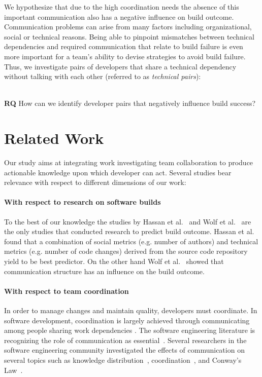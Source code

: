 \documentclass[conference]{IEEEtran}
\begin{document}
We hypothesize that due to the high coordination needs the absence of this
important communication also has a negative influence on build outcome. Communication problems can arise from many factors including organizational,
social or technical reasons. Being able to pinpoint
mismatches between technical dependencies and required communication that
relate to build failure is even more important for a team's
ability to devise strategies to avoid build failure. Thus, we
investigate pairs of developers that share a technical dependency without talking
with each other (referred to as \emph{technical pairs}):
\ \\ \


\textbf{RQ} How can we identify developer pairs that negatively influence build success?
 

 \section{Related Work}
\label{sec:relwork}
Our study aims at integrating work investigating team collaboration to produce actionable knowledge upon which developer can act.
Several studies bear relevance with respect to different dimensions of our work:

\paragraph{With respect to research on software builds}
To the best of our knowledge the studies by Hassan et al.~\cite{hassan:ase:2006}
and Wolf et al.~\cite{wolf:icse:2009} are the only studies that conducted
research to predict build outcome. Hassan et al.~\cite{hassan:ase:2006} found
that a combination of social metrics (e.g. number of authors) and technical
metrics (e.g. number of code changes) derived from the source code repository
yield to be best predictor. 
On the other hand Wolf et al.~\cite{wolf:icse:2009} showed that communication structure has an influence on the build outcome.

\paragraph{With respect to team coordination}
In order to manage changes and maintain quality, developers must coordinate. In
software development, coordination is largely achieved through communicating among
people sharing work dependencies \cite{kraut1995:coordination}. The
software engineering literature is recognizing the role of communication as essential~\cite{nakakoji2010:rdc}.
Several researchers in the software engineering community investigated the effects of communication on several topics such as knowledge distribution~\cite{ehrlich:icgse:2006}, coordination~\cite{hinds:cscw:2006}, and Conway's Law~\cite{cataldo:cscw:2006}.
\end{document}
